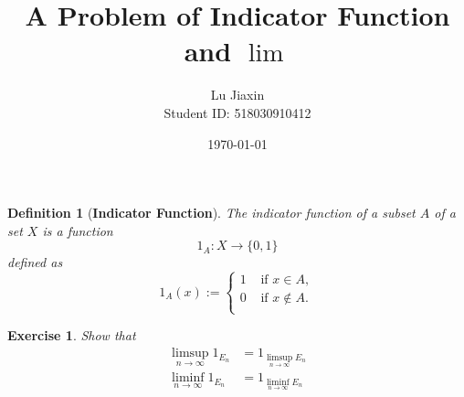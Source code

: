 \documentclass{article}
\title{A Problem of Indicator Function and $\lim$}
\author{Lu Jiaxin\\
Student ID: 518030910412}
\date{\today}
\newtheorem{definition}[theorem]{Definition}
\newtheorem{exercise}[theorem]{Exercise}
\begin{document}
    \maketitle

\begin{tcolorbox}

\begin{definition}[\bf Indicator Function]
    The indicator function of a subset $A$ of a set $X$ is a function
    $$
    1_A : X \rightarrow \{0, 1\}
    $$
    defined as
    $$
    1_A (x) := \left\{
        \begin{aligned}
            1 & \mbox{ if } x \in A, \\
            0 & \mbox{ if } x \notin A.\\
        \end{aligned}
        \right.
    $$
\end{definition}
\begin{exercise}
    Show that 
    \begin{align}
        \limsup_{n\to \infty} 1_{E_n} &= 1_{\limsup_{n\to\infty} E_n}\\
        \liminf_{n\to \infty} 1_{E_n} &= 1_{\liminf_{n\to\infty} E_n}
    \end{align}
\end{exercise}

\end{tcolorbox}
\end{document}
